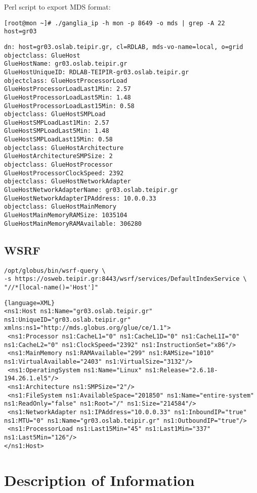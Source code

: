 Perl script to export MDS format:
\begin{verbatim}
[root@mon ~]# ./ganglia_ip -h mon -p 8649 -o mds | grep -A 22 host=gr03
\end{verbatim}
\begin{lstlisting}
dn: host=gr03.oslab.teipir.gr, cl=RDLAB, mds-vo-name=local, o=grid
objectclass: GlueHost
GlueHostName: gr03.oslab.teipir.gr
GlueHostUniqueID: RDLAB-TEIPIR-gr03.oslab.teipir.gr
objectclass: GlueHostProcessorLoad
GlueHostProcessorLoadLast1Min: 2.57
GlueHostProcessorLoadLast5Min: 1.48
GlueHostProcessorLoadLast15Min: 0.58
objectclass: GlueHostSMPLoad
GlueHostSMPLoadLast1Min: 2.57
GlueHostSMPLoadLast5Min: 1.48
GlueHostSMPLoadLast15Min: 0.58
objectclass: GlueHostArchitecture
GlueHostArchitectureSMPSize: 2
objectclass: GlueHostProcessor
GlueHostProcessorClockSpeed: 2392
objectclass: GlueHostNetworkAdapter
GlueHostNetworkAdapterName: gr03.oslab.teipir.gr
GlueHostNetworkAdapterIPAddress: 10.0.0.33
objectclass: GlueHostMainMemory
GlueHostMainMemoryRAMSize: 1035104
GlueHostMainMemoryRAMAvailable: 306280
\end{lstlisting}

\subsection{WSRF}
\begin{verbatim}
/opt/globus/bin/wsrf-query \
-s https://osweb.teipir.gr:8443/wsrf/services/DefaultIndexService \
"//*[local-name()='Host']"
\end{verbatim}
\begin{lstlisting}{language=XML}
<ns1:Host ns1:Name="gr03.oslab.teipir.gr" ns1:UniqueID="gr03.oslab.teipir.gr" xmlns:ns1="http://mds.globus.org/glue/ce/1.1">
 <ns1:Processor ns1:CacheL1="0" ns1:CacheL1D="0" ns1:CacheL1I="0" ns1:CacheL2="0" ns1:ClockSpeed="2392" ns1:InstructionSet="x86"/>
 <ns1:MainMemory ns1:RAMAvailable="299" ns1:RAMSize="1010" ns1:VirtualAvailable="2403" ns1:VirtualSize="3132"/>
 <ns1:OperatingSystem ns1:Name="Linux" ns1:Release="2.6.18-194.26.1.el5"/>
 <ns1:Architecture ns1:SMPSize="2"/>
 <ns1:FileSystem ns1:AvailableSpace="201850" ns1:Name="entire-system" ns1:ReadOnly="false" ns1:Root="/" ns1:Size="214584"/>
 <ns1:NetworkAdapter ns1:IPAddress="10.0.0.33" ns1:InboundIP="true" ns1:MTU="0" ns1:Name="gr03.oslab.teipir.gr" ns1:OutboundIP="true"/>
 <ns1:ProcessorLoad ns1:Last15Min="45" ns1:Last1Min="337" ns1:Last5Min="126"/>
</ns1:Host>
\end{lstlisting}

\section{Description of Information}
